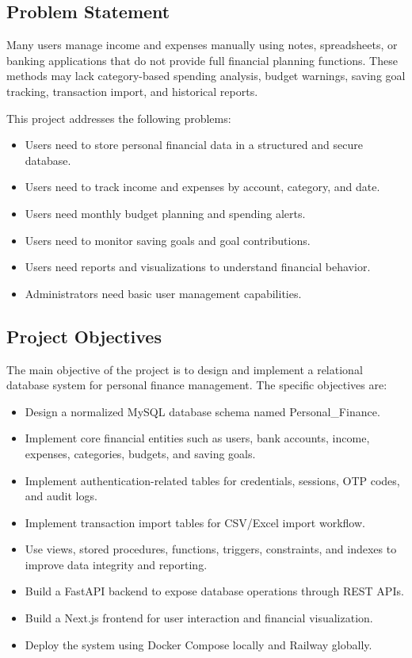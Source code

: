 ﻿\documentclass{article}
\newcommand{\dbname}{Personal\_Finance}
\begin{document}
\subsection{Problem Statement}
Many users manage income and expenses manually using notes, spreadsheets, or banking applications that do not provide full financial planning functions. These methods may lack category-based spending analysis, budget warnings, saving goal tracking, transaction import, and historical reports.

This project addresses the following problems:
\begin{itemize}
    \item Users need to store personal financial data in a structured and secure database.
    \item Users need to track income and expenses by account, category, and date.
    \item Users need monthly budget planning and spending alerts.
    \item Users need to monitor saving goals and goal contributions.
    \item Users need reports and visualizations to understand financial behavior.
    \item Administrators need basic user management capabilities.
\end{itemize}

\subsection{Project Objectives}
The main objective of the project is to design and implement a relational database system for personal finance management. The specific objectives are:
\begin{itemize}
    \item Design a normalized MySQL database schema named \dbname.
    \item Implement core financial entities such as users, bank accounts, income, expenses, categories, budgets, and saving goals.
    \item Implement authentication-related tables for credentials, sessions, OTP codes, and audit logs.
    \item Implement transaction import tables for CSV/Excel import workflow.
    \item Use views, stored procedures, functions, triggers, constraints, and indexes to improve data integrity and reporting.
    \item Build a FastAPI backend to expose database operations through REST APIs.
    \item Build a Next.js frontend for user interaction and financial visualization.
    \item Deploy the system using Docker Compose locally and Railway globally.
\end{itemize}
\end{document}
